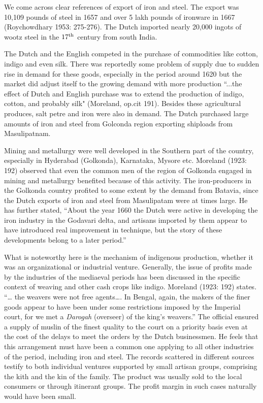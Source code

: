 \vspace{-.3cm}

We come across clear references of export of iron and steel. The export was 10,109 pounds of steel in 1657 and over 5 lakh pounds of ironware in 1667 (Roychowdhary 1953: 275-276). The Dutch imported nearly 20,000 ingots of wootz steel in the $17^{\rm th}$ century from south India.

The Dutch and the English competed in the purchase of commodities like cotton, indigo and even silk. There was reportedly some problem of supply due to sudden rise in demand for these goods, especially in the period around 1620 but the market did adjust itself to the growing demand with more production “...the effect of Dutch and English purchase was to extend the production of indigo, cotton, and probably silk" (Moreland, op.cit 191). Besides these agricultural produces, salt petre and iron were also in demand. The Dutch purchased large amounts of iron and steel from Golconda region exporting shiploads from Masulipatnam.

Mining and metallurgy were well developed in the Southern part of the country, especially in Hyderabad (Golkonda), Karnataka, Mysore etc. Moreland (1923: 192) observed that even the common men of the region of Golkonda engaged in mining and metallurgy benefited because of this activity. The iron-producers in the Golkonda country profited to some extent by the demand from Batavia, since the Dutch exports of iron and steel from Masulipatam were at times large. He has further stated, “About the year 1660 the Dutch were active in developing the iron industry in the Godavari delta, and artisans imported by them appear to have introduced real improvement in technique, but the story of these developments belong to a later period.” 

What is noteworthy here is the mechanism of indigenous production, whether it was an organizational or industrial venture. Generally, the issue of profits made by the industries of the mediaeval periods has been discussed in the specific context of weaving and other cash crops like indigo. Moreland (1923: 192) states. “… the weavers were not free agents…. In Bengal, again, the makers of the finer goods appear to have been under some restrictions imposed by the Imperial court, for we met a {\it Darogah} (overseer) of the king’s weavers.” The official ensured a supply of muslin of the finest quality to the court on a priority basis even at the cost of the delays to meet the orders by the Dutch businessmen. He feels that this arrangement must have been a common one applying to all other industries of the period, including iron and steel. The records scattered in different sources testify to both individual ventures supported by small artisan groups, comprising the kith and the kin of the family. The product was usually sold to the local consumers or through itinerant groups. The profit margin in such cases naturally would have been small.	

